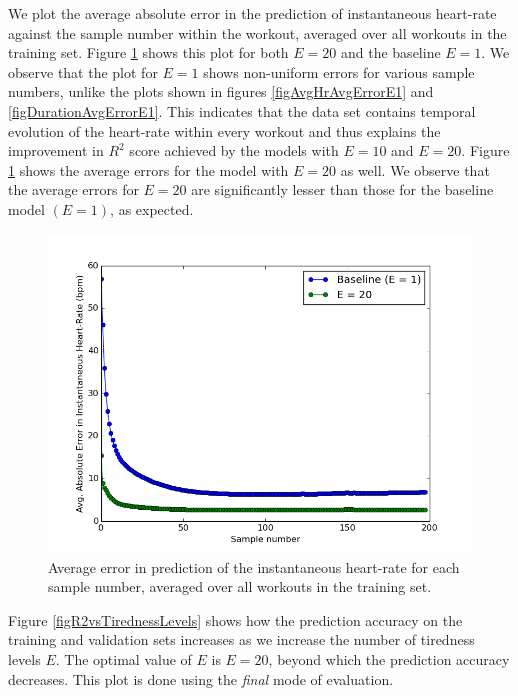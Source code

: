 \documentclass{acm_proc_article-sp}
\begin{document}
We plot the average absolute error in the prediction of instantaneous heart-rate against the sample number within the workout, averaged over all workouts in the training set. Figure \ref{figInstHrErrorVsSample} shows this plot for both $E = 20$ and the baseline $E = 1$. We observe that the plot for $E = 1$ shows non-uniform errors for various sample numbers, unlike the plots shown in figures \ref{figAvgHrAvgErrorE1} and \ref{figDurationAvgErrorE1}. This indicates that the data set contains temporal evolution of the heart-rate within every workout and thus explains the improvement in $R^2$ score achieved by the models with $E = 10$ and $E = 20$. Figure \ref{figInstHrErrorVsSample} shows the average errors for the model with $E = 20$ as well. We observe that the average errors for $E = 20$ are significantly lesser than those for the baseline model $(E = 1)$, as expected.

\begin{figure}[h]
\centering
\includegraphics[scale=0.4]{../src/plots/insthr_error_vs_sample_comparison}
\caption{\label{figInstHrErrorVsSample} Average error in prediction of the instantaneous heart-rate for each sample number, averaged over all workouts in the training set.}
\end{figure}

Figure \ref{figR2vsTirednessLevels} shows how the prediction accuracy on the training and validation sets increases as we increase the number of tiredness levels $E$. The optimal value of $E$ is $E = 20$, beyond which the prediction accuracy decreases. This plot is done using the \emph{final} mode of evaluation.
\end{document}
